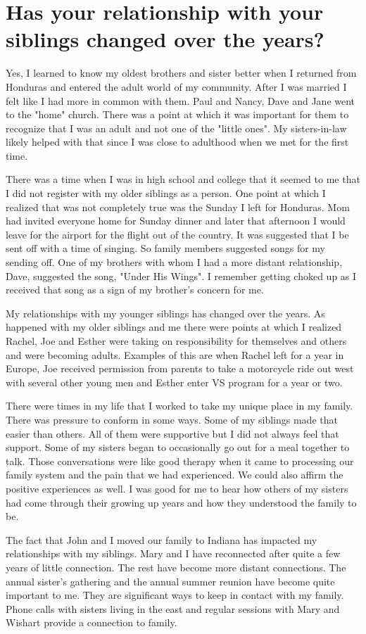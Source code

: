 \section{Has your relationship with your siblings changed over the years?}
Yes, I learned to know my oldest brothers and sister better when I returned from Honduras and entered the adult world of my community.
After I was married I felt like I had more in common with them.
Paul and Nancy, Dave and Jane went to the "home" church.
There was a point at which it was important for them to recognize that I was an adult and not one of the "little ones".
My sisters-in-law likely helped with that since I was close to adulthood when we met for the first time.

There was a time when I was in high school and college that it seemed to me that I did not register with my older siblings as a person.
One point at which I realized that was not completely true was the Sunday I left for Honduras.
Mom had invited everyone home for Sunday dinner and later that afternoon I would leave for the airport for the flight out of the country.
It was suggested that I be sent off with a time of singing.
So family members suggested songs for my sending off.
One of my brothers with whom I had a more distant relationship, Dave, suggested the song, "Under His Wings".
I remember getting choked up as I received that song as a sign of my brother's concern for me.

My relationships with my younger siblings has changed over the years.
As happened with my older siblings and me there were points at which I realized Rachel, Joe and Esther were taking on responsibility for themselves and others and were becoming adults.
Examples of this are when Rachel left for a year in Europe, Joe received permission from parents to take a motorcycle ride out west with several other young men and Esther enter VS program for a year or two.

There were times in my life that I worked to take my unique place in my family.
There was pressure to conform in some ways.
Some of my siblings made that easier than others.
All of them were supportive but I did not always feel that support.
Some of my sisters began to occasionally go out for a meal together to talk.
Those conversations were like good therapy when it came to processing our family system and the pain that we had experienced.
We could also affirm the positive experiences as well.
I was good for me to hear how others of my sisters had come through their growing up years and how they understood the family to be.

The fact that John and I moved our family to Indiana has impacted my relationships with my siblings.
Mary and I have reconnected after quite a few years of little connection.
The rest have become more distant connections.
The annual sister's gathering and the annual summer reunion have become quite important to me.
They are significant ways to keep in contact with my family.
Phone calls with sisters living in the east and regular sessions with Mary and Wishart provide a connection to family.
